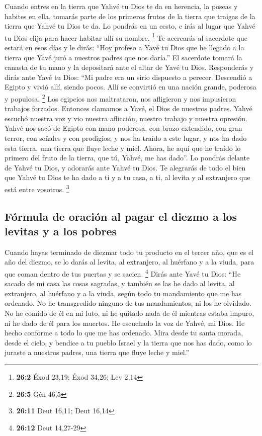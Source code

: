  Cuando entres en la tierra que Yahvé tu Dios te da en
herencia, la poseas y habites en ella,  tomarás parte de
los primeros frutos de la tierra que traigas de la tierra que Yahvé tu
Dios te da. Lo pondrás en un cesto, e irás al lugar que Yahvé tu Dios
elija para hacer habitar allí su nombre. \footnote{\textbf{26:2} Éxod
  23,19; Éxod 34,26; Lev 2,14}  Te acercarás al sacerdote
que estará en esos días y le dirás: ``Hoy profeso a Yavé tu Dios que he
llegado a la tierra que Yavé juró a nuestros padres que nos daría.''
 El sacerdote tomará la canasta de tu mano y la depositará
ante el altar de Yavé tu Dios.  Responderás y dirás ante
Yavé tu Dios: ``Mi padre era un sirio dispuesto a perecer. Descendió a
Egipto y vivió allí, siendo pocos. Allí se convirtió en una nación
grande, poderosa y populosa. \footnote{\textbf{26:5} Gén 46,5}
 Los egipcios nos maltrataron, nos afligieron y nos
impusieron trabajos forzados.  Entonces clamamos a Yavé,
el Dios de nuestros padres. Yahvé escuchó nuestra voz y vio nuestra
aflicción, nuestro trabajo y nuestra opresión.  Yahvé nos
sacó de Egipto con mano poderosa, con brazo extendido, con gran terror,
con señales y con prodigios;  y nos ha traído a este
lugar, y nos ha dado esta tierra, una tierra que fluye leche y miel.
 Ahora, he aquí que he traído lo primero del fruto de la
tierra, que tú, Yahvé, me has dado''. Lo pondrás delante de Yahvé tu
Dios, y adorarás ante Yahvé tu Dios.  Te alegrarás de
todo el bien que Yahvé tu Dios te ha dado a ti y a tu casa, a ti, al
levita y al extranjero que está entre vosotros. \footnote{\textbf{26:11}
  Deut 16,11; Deut 16,14}

\hypertarget{fuxf3rmula-de-oraciuxf3n-al-pagar-el-diezmo-a-los-levitas-y-a-los-pobres}{%
\subsection{Fórmula de oración al pagar el diezmo a los levitas y a los
pobres}\label{fuxf3rmula-de-oraciuxf3n-al-pagar-el-diezmo-a-los-levitas-y-a-los-pobres}}

 Cuando hayas terminado de diezmar todo tu producto en el
tercer año, que es el año del diezmo, se lo darás al levita, al
extranjero, al huérfano y a la viuda, para que coman dentro de tus
puertas y se sacien. \footnote{\textbf{26:12} Deut 14,27-29}
 Dirás ante Yavé tu Dios: ``He sacado de mi casa las
cosas sagradas, y también se las he dado al levita, al extranjero, al
huérfano y a la viuda, según todo tu mandamiento que me has ordenado. No
he transgredido ninguno de tus mandamientos, ni los he olvidado.
 No he comido de él en mi luto, ni he quitado nada de él
mientras estaba impuro, ni he dado de él para los muertos. He escuchado
la voz de Yahvé, mi Dios. He hecho conforme a todo lo que me has
ordenado.  Mira desde tu santa morada, desde el cielo, y
bendice a tu pueblo Israel y la tierra que nos has dado, como lo juraste
a nuestros padres, una tierra que fluye leche y miel.''

